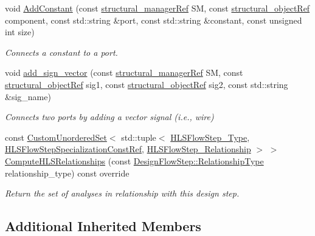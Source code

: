 \begin{DoxyCompactItemize}
void \hyperlink{classmodule__interface_ada3f993c47781a9571fb5edd982a9af2}{Add\+Constant} (const \hyperlink{structural__manager_8hpp_ab3136f0e785d8535f8d252a7b53db5b5}{structural\+\_\+manager\+Ref} SM, const \hyperlink{structural__objects_8hpp_a8ea5f8cc50ab8f4c31e2751074ff60b2}{structural\+\_\+object\+Ref} component, const std\+::string \&port, const std\+::string \&constant, const unsigned int size)
\begin{DoxyCompactList}\small\item\em Connects a constant to a port. \end{DoxyCompactList}\item 
void \hyperlink{classmodule__interface_a07e4684bc7c049dde53a1b1ab7fa450e}{add\+\_\+sign\+\_\+vector} (const \hyperlink{structural__manager_8hpp_ab3136f0e785d8535f8d252a7b53db5b5}{structural\+\_\+manager\+Ref} SM, const \hyperlink{structural__objects_8hpp_a8ea5f8cc50ab8f4c31e2751074ff60b2}{structural\+\_\+object\+Ref} sig1, const \hyperlink{structural__objects_8hpp_a8ea5f8cc50ab8f4c31e2751074ff60b2}{structural\+\_\+object\+Ref} sig2, const std\+::string \&sig\+\_\+name)
\begin{DoxyCompactList}\small\item\em Connects two ports by adding a vector signal (i.\+e., wire) \end{DoxyCompactList}\item 
const \hyperlink{classCustomUnorderedSet}{Custom\+Unordered\+Set}$<$ std\+::tuple$<$ \hyperlink{hls__step_8hpp_ada16bc22905016180e26fc7e39537f8d}{H\+L\+S\+Flow\+Step\+\_\+\+Type}, \hyperlink{hls__step_8hpp_a5fdd2edf290c196531d21d68e13f0e74}{H\+L\+S\+Flow\+Step\+Specialization\+Const\+Ref}, \hyperlink{hls__step_8hpp_a3ad360b9b11e6bf0683d5562a0ceb169}{H\+L\+S\+Flow\+Step\+\_\+\+Relationship} $>$ $>$ \hyperlink{classmodule__interface_a48a74ac615057c46e4bc09b05b644e73}{Compute\+H\+L\+S\+Relationships} (const \hyperlink{classDesignFlowStep_a723a3baf19ff2ceb77bc13e099d0b1b7}{Design\+Flow\+Step\+::\+Relationship\+Type} relationship\+\_\+type) const override
\begin{DoxyCompactList}\small\item\em Return the set of analyses in relationship with this design step. \end{DoxyCompactList}\end{DoxyCompactItemize}
\subsection*{Additional Inherited Members}


